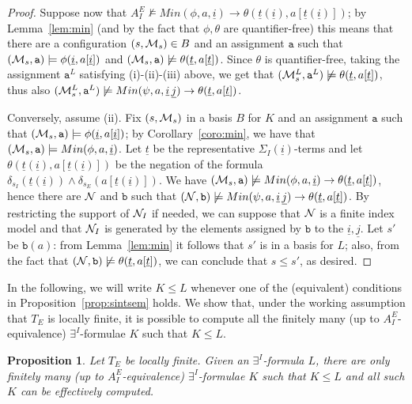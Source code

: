 \documentclass{LMCS}
\newcommand{\ui}{\ensuremath{\underline i}}
\newcommand{\uj}{\ensuremath{\underline j}}
\newcommand{\ut}{\ensuremath{\underline t}}
\newcommand{\cM}{\ensuremath \mathcal M}
\newcommand{\cN}{\ensuremath \mathcal N}
\theoremstyle{plain}\newtheorem{assumption}[thm]{Assumption}
\theoremstyle{plain}\newtheorem{proposition}[thm]{Proposition}
\theoremstyle{plain}\newtheorem{property}[thm]{Property}
\theoremstyle{plain}\newtheorem{example}[thm]{Example}
\theoremstyle{plain}\newtheorem{claim}[thm]{Claim}
\theoremstyle{plain}\newtheorem{lemma}[thm]{Lemma}
\begin{document}
\begin{proof}
    Suppose now that $A^E_I\not\models Min(\phi,a,\ui)\to
    \theta(\ut(\ui), a[\ut(\ui)])$; by Lemma~\ref{lem:min} (and by the
    fact that $\phi, \theta$ are quantifier-free) this means that
    there are a configuration $(s, \cM_s)\in B$ and an assignment
    $\mathtt{a}$ such that $(\cM_s, \mathtt{a})\models \phi(\ui,
    a[\ui])$ and $(\cM_s, \mathtt{a})\not \models \theta(\ut,
    a[\ut])$.  Since $\theta$ is quantifier-free, taking the
    assignment $\mathtt{a}^L$ satisfying (i)-(ii)-(iii) above, we get
    that $(\cM_s^L, \mathtt{ a}^L)\not \models \theta(\ut, a[\ut])$,
    thus also $(\cM_s^L, \mathtt{ a}^L)\not \models Min(\psi, a,
    \ui\,\uj) \to\theta(\ut, a[\ut])$.

    Conversely, assume (ii). Fix $(s, \cM_s)$ in a basis $B$ for $K$
    and an assignment $\mathtt{a}$ such that $(\cM_s,
    \mathtt{a})\models \phi(\ui, a[\ui])$; by
    Corollary~\ref{coro:min}, we have that $(\cM_s, \mathtt{a})\models
    Min(\phi,a,\ui)$.  Let $\ut$ be the representative
    $\Sigma_I(\ui)$-terms and let $\theta(\ut(\ui), a[\ut(\ui)])$ be
    the negation of the formula $\delta_{s_I}(\ut(\ui))\wedge
    \delta_{s_E}(a[\ut(\ui)])$.
We have $(\cM_s, \mathtt{a})\not\models Min(\phi,a,\ui) \to
    \theta(\ut, a[\ut])$, hence there are $\cN$ and $\mathtt{b}$ such
    that $(\cN, \mathtt{b})\not\models Min(\psi,a,\ui\,\uj) \to
    \theta(\ut, a[\ut])$. By restricting the support of $\cN_I$ if
    needed, we can suppose that $\cN$ is a finite index model and that
    $\cN_I$ is generated by the elements assigned by $\mathtt{b}$ to
    the $\ui, \uj$.  Let $s'$ be $\mathtt{b}(a)$: from
    Lemma~\ref{lem:min} it follows that $s'$ is in a basis for $L$;
    also, from the fact that $(\cN, \mathtt{b})\not\models\theta(\ut,
    a[\ut])$, we can conclude that $s\leq s'$, as desired.
\end{proof}
In the following, we will write $K\leq L$ whenever one of the
(equivalent) conditions in Proposition~\ref{prop:sintsem} holds. We
show that, under the working assumption that $T_E$ is locally finite,
it is possible to compute all the finitely many (up to
$A^E_I$-equivalence) $\exists^I$-formulae $K$ such that $K\leq L$.
\begin{proposition}
  \label{prop:finitelymany}
  Let $T_E$ be locally finite.  Given an $\exists^I$-formula $L$,
  there are only finitely many (up to $A^E_I$-equivalence)
  $\exists^I$-formulae $K$ such that $K\leq L$ and all such $K$ can be
  effectively computed.
\end{proposition}
\end{document}
